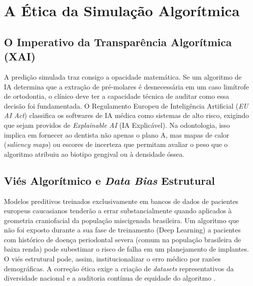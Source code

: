 \section{A Ética da Simulação Algorítmica}
\label{sec:etica-simulacao}

\subsection{O Imperativo da Transparência Algorítmica (XAI)}

A predição simulada traz consigo a opacidade matemática. Se um algoritmo de IA determina que a extração de pré-molares é desnecessária em um caso limítrofe de ortodontia, o clínico deve ter a capacidade técnica de auditar como essa decisão foi fundamentada. O Regulamento Europeu de Inteligência Artificial (\textit{EU AI Act}) classifica os softwares de IA médica como sistemas de alto risco, exigindo que sejam providos de \textit{Explainable AI} (IA Explicável). Na odontologia, isso implica em fornecer ao dentista não apenas o plano A, mas mapas de calor (\textit{saliency maps}) ou escores de incerteza que permitam avaliar o peso que o algoritmo atribuiu ao biotipo gengival ou à densidade óssea.

\subsection{Viés Algorítmico e \textit{Data Bias} Estrutural}

Modelos preditivos treinados exclusivamente em bancos de dados de pacientes europeus caucasianos tenderão a errar substancialmente quando aplicados à geometria craniofacial da população miscigenada brasileira. Um algoritmo que não foi exposto durante a sua fase de treinamento (Deep Learning) a pacientes com histórico de doença periodontal severa (comum na população brasileira de baixa renda) pode subestimar o risco de falha em um planejamento de implantes. O viés estrutural pode, assim, institucionalizar o erro médico por razões demográficas. A correção ética exige a criação de \textit{datasets} representativos da diversidade nacional e a auditoria contínua de equidade do algoritmo \cite{roy2025editorial}.
